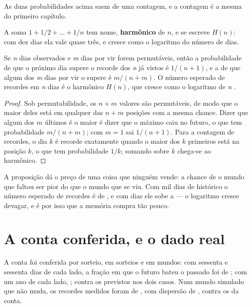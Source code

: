 As duas probabilidades acima saem de uma contagem, e a contagem é a mesma do primeiro capítulo.

A soma $1 + 1/2 + \dots + 1/n$ tem nome, \textbf{harmônico} de $n$, e se escreve $H(n)$: com dez
dias ela vale quase três, e cresce como o logaritmo do número de dias.

\begin{proposicao}\label{prop:recorde}
Se \emph{n} dias observados e \emph{m} dias por vir forem permutáveis, então a probabilidade de que
o próximo dia supere o recorde dos \emph{n} já vistos é $1/(n+1)$, e a de que algum dos \emph{m}
dias por vir o supere é $m/(n+m)$. O número esperado de recordes em \emph{n} dias é o harmônico
$H(n)$, que cresce como o logaritmo de \emph{n} \cite{arnold1998records}.
\end{proposicao}

\begin{proof}
Sob permutabilidade, os $n+m$ valores são permutáveis, de modo que o maior deles está em qualquer
das $n+m$ posições com a mesma chance. Dizer que algum dos $m$ últimos é o maior é dizer que o
máximo caiu no futuro, o que tem probabilidade $m/(n+m)$; com $m=1$ sai $1/(n+1)$. Para a contagem
de recordes, o dia $k$ é recorde exatamente quando o maior dos $k$ primeiros está na posição $k$,
o que tem probabilidade $1/k$; somando sobre $k$ chega-se ao harmônico.
\end{proof}

A proposição dá o preço de uma coisa que ninguém vende: a chance de o mundo que faltou ser pior do
que o mundo que se viu. Com mil dias de histórico o número esperado de recordes é de \numRecordeEsperadoMil{}, e com
\numRecordeDiasPorMundo{} dias ele sobe a \numRecordeEsperadoMundo{} --- o
logaritmo cresce devagar, e é por isso que a memória compra tão pouco.

\section{A conta conferida, e o dado real}

A conta foi conferida por sorteio, em \numRecordeSorteios{} sorteios e em \numRecordeSementes{}
mundos: com sessenta e sessenta dias de cada lado, a fração em que o futuro bateu o passado foi de
\numRecordeMedidoSessenta{}; com um ano de cada lado, \numRecordeMedidoAno{}; contra os
\numRecordeProbabilidade{} previstos nos dois casos. Num mundo simulado que não muda, os recordes
medidos foram de \numRecordeParado{}, com dispersão de \numRecordeParadoDispersao{}, contra os
\numRecordeEsperadoMundo{} da conta.

